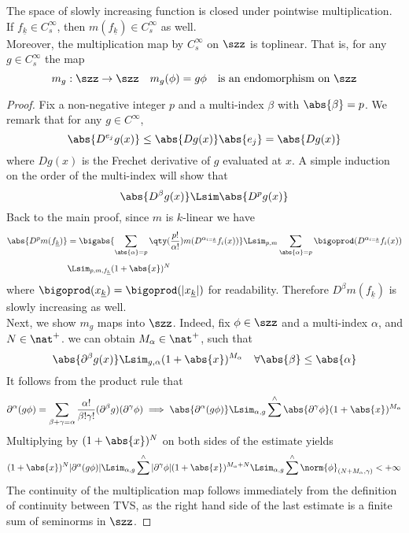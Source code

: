 \documentclass[../main-v2-manifolds.tex]{subfiles}
\begin{document}
\begin{lemma}\label{lem:slowly increasing lemma}
The space of slowly increasing function is closed under pointwise multiplication. If $f_{\underline{k}}\in C_s^\infty$, then $m(f_{\underline{k}})\in C_s^\infty$ as well. \\

Moreover, the multiplication map by $C_s^\infty$ on $\szz$ is toplinear. That is, for any $g\in C_s^\infty$ the map 
\[
m_g: \szz\to\szz \quad m_g(\phi) = g\phi\quad\text{is an endomorphism on }\szz
\]
\end{lemma}
\begin{proof}
    Fix a non-negative integer $p$ and a multi-index $\beta$ with $\abs{\beta}=p$. We remark that for any $g\in C^\infty$, 
    \[
        \abs{D^{e_j} g(x)}\leq \abs{Dg(x)}\abs{e_j}=\abs{Dg(x)}
    \]
    where $Dg(x)$ is the Frechet derivative of $g$ evaluated at $x$. A simple induction on the order of the multi-index will show that 
    \[
        \abs{D^\beta g(x)}\Lsim \abs{D^p g(x)}
    \]
    Back to the main proof, since $m$ is $k$-linear we have
    \begin{align*}
        \abs{D^p m(f_{\underline{k}})} &= \bigabs{\sum_{\abs{\alpha}=p}\qty(\frac{p!}{\alpha!})m(D^{\alpha_{i=\underline{k}}}f_i(x))}\Lsim_{p,m}\sum_{\abs{\alpha}=p}\bigoprod(D^{\alpha_{i=\underline{k}}} f_i(x))\\[1ex]
        &\Lsim_{p,m,f_{{\underline{k}}}} (1+\abs{x})^N
    \end{align*}
    where $\bigoprod(x_{\underline{k}}) = \bigoprod(\vert x_{\underline{k}}\vert)$ for readability. Therefore $D^\beta m(f_{\underline{k}})$ is slowly increasing as well.\\
    
    Next, we show $m_g$ maps into $\szz$. Indeed, fix $\phi\in\szz$ and a multi-index $\alpha$, and $N\in\nat^+$. we can obtain $M_\alpha\in\nat^+$, such that
    \[
    \abs{\partial^\beta g(x)}\Lsim_{g,\alpha} (1+\abs{x})^{M_\alpha}\quad\forall\abs{\beta}\leq\abs{\alpha}
    \]
    It follows from the product rule that
    \[
    \partial^\alpha (g\phi) = \sum_{\beta+\gamma = \alpha}\dfrac{\alpha!}{\beta!\gamma!}(\partial^\beta g)(\partial^\gamma \phi)\implies\abs{\partial^\alpha(g\phi)}\Lsim_{\alpha,g}\sum^{\wedge}\abs{\partial^\gamma\phi}(1+\abs{x})^{M_{\alpha}}
    \]
    Multiplying by $(1+\abs{x})^{N}$ on both sides of the estimate yields
    \[
    (1+\abs{x})^N\vert\partial^\alpha(g\phi)\vert\Lsim_{\alpha,g}\sum^{\wedge}\vert\partial^\gamma\phi\vert(1+\abs{x})^{M_\alpha + N}\Lsim_{\alpha,g}\sum^{\wedge}\norm{\phi}_{(N+M_\alpha,\gamma)}<+\infty
    \]
    The continuity of the multiplication map follows immediately from the definition of continuity between TVS, as the right hand side of the last estimate is a finite sum of seminorms in $\szz$.
    
    
\end{proof}
\end{document}
